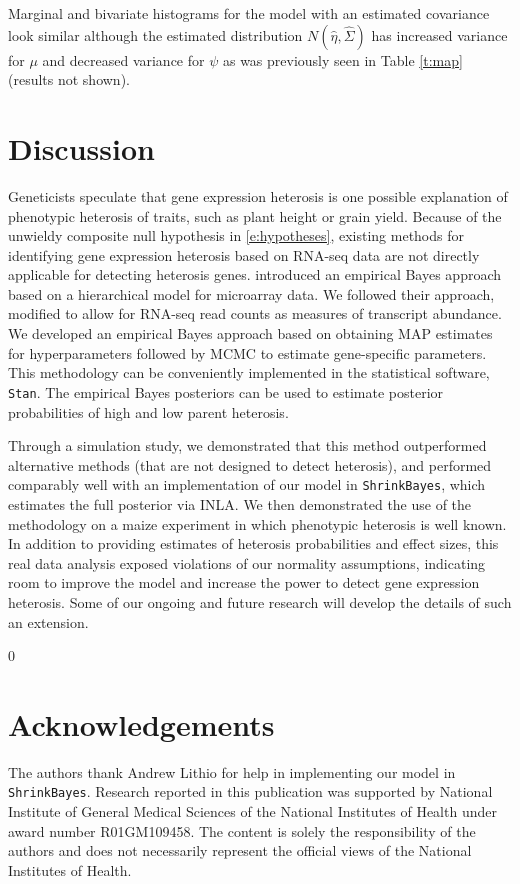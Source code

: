 \documentclass[useAMS,usenatbib,referee]{biom}
\newcommand{\blind}{0} %
\newcommand{\ShrinkBayes}{{\tt ShrinkBayes}}
\begin{document}
Marginal and bivariate histograms for the model with an estimated covariance look similar although the estimated distribution $N(\hat{\eta},\hat{\Sigma})$ has increased variance for $\mu$ and decreased variance for $\psi$ as was previously seen in Table \ref{t:map} (results not shown). 

\section{Discussion}
\label{s:discussion}

Geneticists speculate that gene expression heterosis is one possible explanation of phenotypic heterosis of traits, such as plant height or grain yield. Because of the unwieldy composite null hypothesis in \eqref{e:hypotheses}, existing methods for identifying gene expression heterosis based on RNA-seq data are not directly applicable for detecting heterosis genes. \cite{ji2014estimation} introduced an empirical Bayes approach based on a hierarchical model for microarray data. We followed their approach, modified to allow for RNA-seq read counts as measures of transcript abundance. We developed an empirical Bayes approach based on obtaining MAP estimates for hyperparameters followed by MCMC to estimate gene-specific parameters. This methodology can be conveniently implemented in the statistical software, {\tt Stan}. The empirical Bayes posteriors can be used to estimate posterior probabilities of high and low parent heterosis.  

Through a simulation study, we demonstrated that this method outperformed alternative methods (that are not designed to detect heterosis), and performed comparably well with an implementation of our model in \ShrinkBayes{}, which estimates the full posterior via INLA. We then demonstrated the use of the methodology on a maize experiment in which phenotypic heterosis is well known. 
In addition to providing estimates of heterosis probabilities and effect sizes, this real data analysis exposed violations of our normality assumptions, indicating room to improve the model and increase the power to detect gene expression heterosis. Some of our ongoing and future research will develop the details of such an extension.





\backmatter %

\blind{
\section*{Acknowledgements}

The authors thank Andrew Lithio for help in implementing our model in \ShrinkBayes{}. Research reported in this publication was supported by National Institute of General Medical Sciences of the National Institutes of Health under award number R01GM109458. The content is solely the responsibility of the authors and does not necessarily represent the official views of the National Institutes of Health.
} \fi
\end{document}
